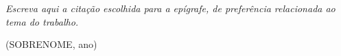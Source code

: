 \begin{epigrafe}
  \vspace*{\fill}
  \hspace{.45\textwidth}%
  \begin{minipage}{.55\textwidth}
    \raggedright
    \textit{Escreva aqui a citação escolhida para a epígrafe, de
    preferência relacionada ao tema do trabalho.}

    \begin{flushright}(SOBRENOME, ano)\end{flushright}
  \end{minipage}
\end{epigrafe}
